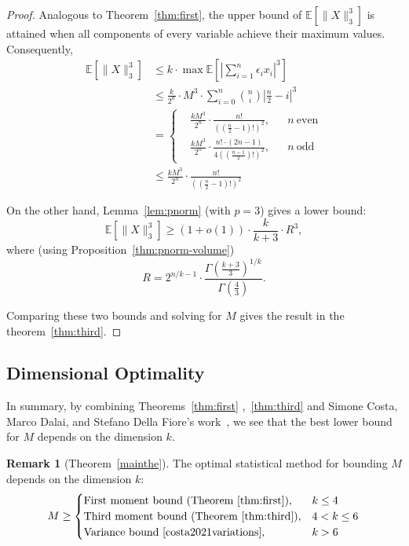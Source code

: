 \documentclass[11pt]{amsart}
\theoremstyle{plain}
\theoremstyle{definition}
\newtheorem{remark}[theorem]{Remark}
\numberwithin{equation}{section}
\begin{document}
\begin{proof}
Analogous to Theorem~\ref{thm:first}, the upper bound of $\mathbb{E}[\|X\|_3^3]$ is attained when all components of every variable achieve their maximum values. Consequently,
\begin{align*}
    \mathbb{E}[\|X\|_3^3] &\leq k \cdot \max \mathbb{E}\left[\left|\sum_{i=1}^n \epsilon_i x_i\right|^3\right] \\
    &\leq \frac{k}{2^n} \cdot M^3 \cdot \sum_{i=0}^n \binom{n}{i} \left|\frac{n}{2} - i\right|^3 \\
    &= 
    \left\{
    \begin{aligned}
        &\frac{kM^3}{2^n}\cdot \frac{n!}{\left((\frac{n}{2}-1)!\right)^2}, && n\ \text{even} \\[1.2ex]
        &\frac{kM^3}{2^n}\cdot \frac{n!\cdot(2n-1)}{4\left((\frac{n-1}{2})!\right)^2}, && n\ \text{odd}
    \end{aligned}
    \right.\\
    &\leq \frac{kM^3}{2^n}\cdot \frac{n!}{\left((\frac{n}{2}-1)!\right)^2}
\end{align*}

On the other hand, Lemma~\ref{lem:pnorm} (with $p=3$) gives a lower bound:
\begin{equation}
\mathbb{E}[\|X\|_3^3] \geq (1+o(1)) \cdot \frac{k}{k+3} \cdot R^3,
\end{equation}
where (using Proposition~\ref{thm:pnorm-volume})
\[
R = 2^{n/k-1} \cdot \frac{\Gamma\left(\frac{k+3}{3}\right)^{1/k}}{\Gamma\left(\frac{4}{3}\right)}.
\]

Comparing these two bounds and solving for $M$ gives the result in the theorem~\ref{thm:third}.
\end{proof}

\subsection{Dimensional Optimality}

In summary, by combining Theorems~\ref{thm:first} ,~\ref{thm:third} and Simone Costa, Marco Dalai, and Stefano Della Fiore's work~\cite{costa2021variations}, we see that the best lower bound for $M$ depends on the dimension $k$.

\begin{remark}[Theorem~\ref{mainthe}]
The optimal statistical method for bounding $M$ depends on the dimension $k$:
\[
M \geq \begin{cases}
\text{First moment bound (Theorem~\ref{thm:first})}, & k \leq 4 \\
\text{Third moment bound (Theorem~\ref{thm:third})}, & 4 < k \leq 6 \\
\text{Variance bound \cite{costa2021variations}}, & k > 6
\end{cases}
\]
\end{remark}
\end{document}
